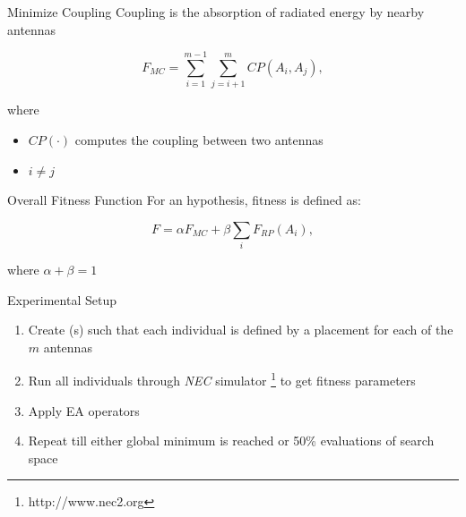 \documentclass{beamer}
\begin{document}
        \begin{frame}{Minimize Coupling}
            Coupling is the absorption of radiated energy by nearby antennas
            \begin{tcolorbox}[colback=green!5]
                \begin{equation}
                    F_{MC} = \sum_{i=1}^{m-1}\sum_{j=i+1}^{m} CP(A_i, A_j),
                \end{equation}
            \end{tcolorbox}
            where
            \begin{itemize}
                \item $CP(\cdot)$ computes the coupling between two antennas
                \item $i \neq j$
            \end{itemize}
        \end{frame}


        \begin{frame}{Overall Fitness Function}
            For an hypothesis, fitness is defined as:
            \begin{tcolorbox}[colback=green!5]
                \begin{equation} \label{eq:optimal}
                    F = \alpha F_{MC} + \beta \sum_{i} F_{RP}(A_i),
                \end{equation}
            \end{tcolorbox}
            where $\alpha + \beta = 1$
        \end{frame}


        \begin{frame}[t]{Experimental Setup}
            \begin{enumerate}
                \item Create (s) such that each individual is defined by a placement for each of the $m$ antennas
                \item Run all individuals through \textit{NEC} simulator \footnote{http://www.nec2.org} to get fitness parameters 
                \item Apply EA operators 
                \item Repeat till either global minimum is reached or 50\% evaluations of search space 
            \end{enumerate}
            \vspace{10mm}
        \end{frame}
\end{document}
